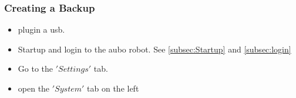 \documentclass{article}
\begin{document}
\subsubsection{Creating a Backup}
\begin{itemize}
\item plugin a usb. 
\item Startup and login to the aubo robot. See \ref{subsec:Startup} and \ref{subsec:login}
\item Go to the $'Settings'$ tab.
\begin{center}
\end{center}
\item open the $'System'$ tab on the left
\begin{center}

\end{center}
\end{itemize}
\end{document}
